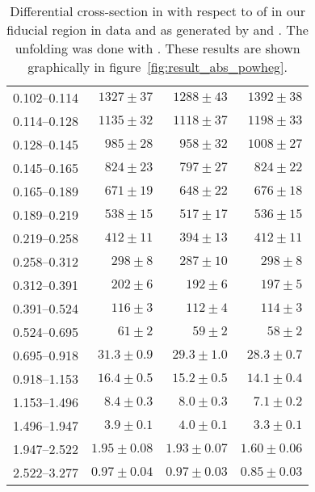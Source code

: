 \begin{table}
\begin{center}
\begin{tabular}{@{}l r r r@{}}
            0.102--0.114  &  $1327  \pm  37$    &  $1288  \pm  43$    &  $1392  \pm  38$    \\
            0.114--0.128  &  $1135  \pm  32$    &  $1118  \pm  37$    &  $1198  \pm  33$    \\
            0.128--0.145  &  $985   \pm  28$    &  $958   \pm  32$    &  $1008  \pm  27$    \\
            0.145--0.165  &  $824   \pm  23$    &  $797   \pm  27$    &  $824   \pm  22$    \\
            0.165--0.189  &  $671   \pm  19$    &  $648   \pm  22$    &  $676   \pm  18$    \\
            0.189--0.219  &  $538   \pm  15$    &  $517   \pm  17$    &  $536   \pm  15$    \\
            0.219--0.258  &  $412   \pm  11$    &  $394   \pm  13$    &  $412   \pm  11$    \\
            0.258--0.312  &  $298   \pm  8$     &  $287   \pm  10$    &  $298   \pm  8$     \\
            0.312--0.391  &  $202   \pm  6$     &  $192   \pm  6$     &  $197   \pm  5$     \\
            0.391--0.524  &  $116   \pm  3$     &  $112   \pm  4$     &  $114   \pm  3$     \\
            0.524--0.695  &  $61    \pm  2$     &  $59    \pm  2$     &  $58    \pm  2$     \\
            0.695--0.918  &  $31.3  \pm  0.9$   &  $29.3  \pm  1.0$   &  $28.3  \pm  0.7$   \\
            0.918--1.153  &  $16.4  \pm  0.5$   &  $15.2  \pm  0.5$   &  $14.1  \pm  0.4$   \\
            1.153--1.496  &  $8.4   \pm  0.3$   &  $8.0   \pm  0.3$   &  $7.1   \pm  0.2$   \\
            1.496--1.947  &  $3.9   \pm  0.1$   &  $4.0   \pm  0.1$   &  $3.3   \pm  0.1$   \\
            1.947--2.522  &  $1.95  \pm  0.08$  &  $1.93  \pm  0.07$  &  $1.60  \pm  0.06$  \\
            2.522--3.277  &  $0.97  \pm  0.04$  &  $0.97  \pm  0.03$  &  $0.85  \pm  0.03$  \\
            \bottomrule
        \end{tabular}
    \end{center}
    \caption[
        Differential cross-section in \pb with respect to \phistar of \Ztoee
        with \POWHEG unfolding.
    ]{
        Differential cross-section in \pb with respect to \phistar of \Ztoee in
        our fiducial region in data and as generated by \MADGRAPH and \POWHEG.
        The unfolding was done with \POWHEG. These results are shown
        graphically in figure~\ref{fig:result_abs_powheg}.
    }
    \label{tab:results_abs_powheg}
\end{table}
